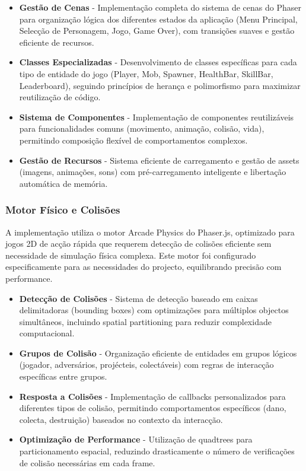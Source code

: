 \begin{itemize}
  \item \textbf{Gestão de Cenas} - Implementação completa do sistema de cenas do Phaser para organização lógica dos diferentes estados da aplicação (Menu Principal, Selecção de Personagem, Jogo, Game Over), com transições suaves e gestão eficiente de recursos.
  
  \item \textbf{Classes Especializadas} - Desenvolvimento de classes específicas para cada tipo de entidade do jogo (Player, Mob, Spawner, HealthBar, SkillBar, Leaderboard), seguindo princípios de herança e polimorfismo para maximizar reutilização de código.
  
  \item \textbf{Sistema de Componentes} - Implementação de componentes reutilizáveis para funcionalidades comuns (movimento, animação, colisão, vida), permitindo composição flexível de comportamentos complexos.
  
  \item \textbf{Gestão de Recursos} - Sistema eficiente de carregamento e gestão de assets (imagens, animações, sons) com pré-carregamento inteligente e libertação automática de memória.
\end{itemize}

\subsubsection{Motor Físico e Colisões}
\hspace{2em} A implementação utiliza o motor Arcade Physics do Phaser.js, optimizado para jogos 2D de acção rápida que requerem detecção de colisões eficiente sem necessidade de simulação física complexa. Este motor foi configurado especificamente para as necessidades do projecto, equilibrando precisão com performance.

\begin{itemize}
  \item \textbf{Detecção de Colisões} - Sistema de detecção baseado em caixas delimitadoras (bounding boxes) com optimizações para múltiplos objectos simultâneos, incluindo spatial partitioning para reduzir complexidade computacional.
  
  \item \textbf{Grupos de Colisão} - Organização eficiente de entidades em grupos lógicos (jogador, adversários, projécteis, colectáveis) com regras de interacção específicas entre grupos.
  
  \item \textbf{Resposta a Colisões} - Implementação de callbacks personalizados para diferentes tipos de colisão, permitindo comportamentos específicos (dano, colecta, destruição) baseados no contexto da interacção.
  
  \item \textbf{Optimização de Performance} - Utilização de quadtrees para particionamento espacial, reduzindo drasticamente o número de verificações de colisão necessárias em cada frame.
\end{itemize}


